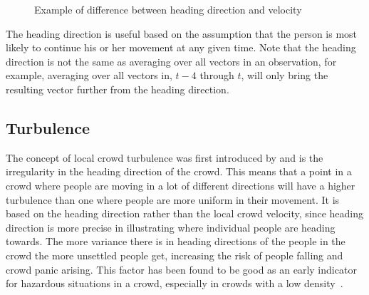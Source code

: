\begin{figure}[htbp]
\centering
{}
\caption{Example of difference between heading direction and velocity}
\label{fig:headingvsvelocity}
\end{figure}

The heading direction is useful based on the assumption that the person is most likely to continue his or her movement at any given time. Note that the heading direction is not the same as averaging over all vectors in an observation, for example, averaging over all vectors in, $t-4$ through $t$, will only bring the resulting vector further from the heading direction.



\subsection{Turbulence}
\label{sub:crowdFactorTurbulence}
The concept of local crowd turbulence was first introduced by \citet{videoanalysis} and is the irregularity in the heading direction of the crowd. This means that a point in a crowd where people are moving in a lot of different directions will have a higher turbulence than one where people are more uniform in their movement. It is based on the heading direction rather than the local crowd velocity, since heading direction is more precise in illustrating where individual people are heading towards. The more variance there is in heading directions of the people in the crowd the more unsettled people get, increasing the risk of people falling and crowd panic arising. This factor has been found to be good as an early indicator for hazardous situations in a crowd, especially in crowds with a low density~\cite{wirz2012inferring}.


